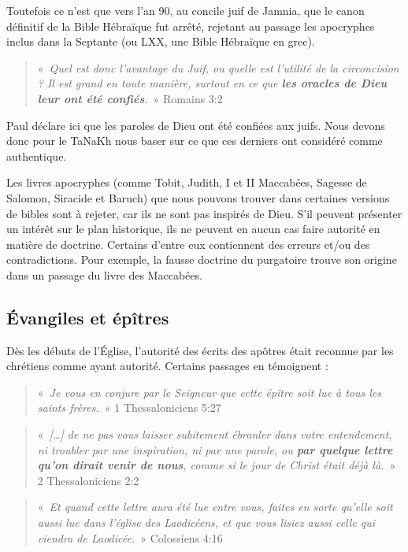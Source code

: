 \begin{small}
Toutefois ce n'est que vers l'an 90, au concile juif de Jamnia, que le canon définitif de la Bible Hébraïque fut arrêté, rejetant au passage les apocryphes inclus dans la Septante (ou LXX, une Bible Hébraïque en grec).

\begin{quote}
«~\emph{Quel est donc l'avantage du Juif, ou quelle est l'utilité de la circoncision ? Il est grand en toute manière, surtout en ce que \textbf{les oracles de Dieu leur ont été confiés}.}~» Romains 3:2
\end{quote}

Paul déclare ici que les paroles de Dieu ont été confiées aux juifs. Nous devons donc pour le TaNaKh nous baser sur ce que ces derniers ont considéré comme authentique.\bigskip

Les livres apocryphes (comme Tobit, Judith, I et II Maccabées, Sagesse de Salomon, Siracide et Baruch) que nous pouvons trouver dans certaines versions de bibles sont à rejeter, car ils ne sont pas inspirés de Dieu. S'il peuvent présenter un intérêt sur le plan historique, ils ne peuvent en aucun cas faire autorité en matière de doctrine. Certains d'entre eux contiennent des erreurs et/ou des contradictions. Pour exemple, la fausse doctrine du purgatoire trouve son origine dans un passage du livre des Maccabées.

\subsection*{Évangiles et épîtres}

Dès les débuts de l'Église, l'autorité des écrits des apôtres était reconnue par les chrétiens comme ayant autorité. Certains passages en témoignent :

\begin{quote}
«~\emph{Je vous en conjure par le Seigneur que cette épître soit lue à tous les saints frères.}~» 1 Thessaloniciens 5:27
\end{quote}

\begin{quote}
«~\emph{[…] de ne pas vous laisser subitement ébranler dans votre entendement, ni troubler par une inspiration, ni par une parole, ou \textbf{par quelque lettre qu'on dirait venir de nous}, comme si le jour de Christ était déjà là.}~» 2 Thessaloniciens 2:2
\end{quote}

\begin{quote}
«~\emph{Et quand cette lettre aura été lue entre vous, faites en sorte qu'elle soit aussi lue dans l'église des Laodicéens, et que vous lisiez aussi celle qui viendra de Laodicée.}~» Colossiens 4:16
\end{quote}


\end{small}

